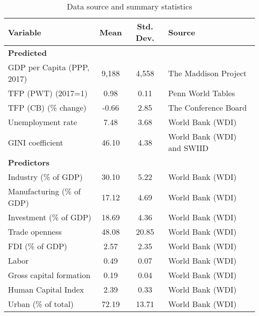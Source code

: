 \begin{table}[!htbp]
\begin{center}
\caption{Data source and summary statistics} \label{table:1}
\begin{tabular}{lccl} \\ \toprule
  Variable                   & Mean  & Std. Dev. & Source                     \\ \midrule
  \textbf{Predicted}         &       &           &                            \\
  GDP per Capita (PPP, 2017) & 9,188 & 4,558     & The Maddison Project       \\
  TFP (PWT) (2017=1)         & 0.98  & 0.11      & Penn World Tables          \\
  TFP (CB) (\% change)       & -0.66 & 2.85      & The Conference Board       \\
  Unemployment rate          & 7.48  & 3.68      & World Bank (WDI)           \\
  GINI coefficient           & 46.10 & 4.38      & World Bank (WDI) and SWIID \\ \midrule
  \textbf{Predictors}        &       &           &                            \\
  Industry (\% of GDP)       & 30.10 & 5.22      & World Bank (WDI)           \\
  Manufacturing (\% of GDP)  & 17.12 & 4.69      & World Bank (WDI)           \\
  Investment (\% of GDP)     & 18.69 & 4.36      & World Bank (WDI)           \\
  Trade openness             & 48.08 & 20.85     & World Bank (WDI)           \\
  FDI (\% of GDP)            & 2.57  & 2.35      & World Bank (WDI)           \\
  Labor                      & 0.49  & 0.07      & World Bank (WDI)           \\
  Gross capital formation    & 0.19  & 0.04      & World Bank (WDI)           \\
  Human Capital Index        & 2.39  & 0.33      & World Bank (WDI)           \\
  Urban (\% of total)        & 72.19 & 13.71     & World Bank (WDI)           \\ \bottomrule 
\end{tabular}
\end{center}
\end{table}